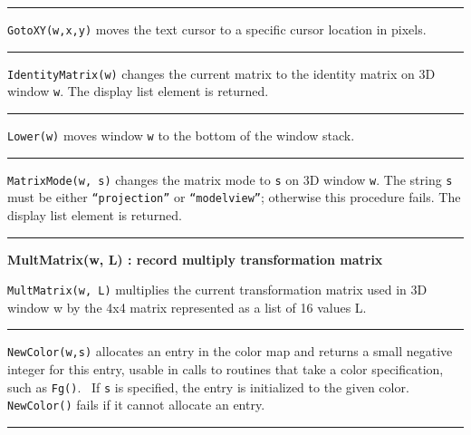 \bigskip\hrule\vspace{0.1cm}

\noindent
\texttt{GotoXY(w,x,y)} moves the text cursor to a specific cursor
location in pixels.

\bigskip\hrule\vspace{0.1cm}

\noindent
\texttt{IdentityMatrix(w)} changes the current matrix to the identity
matrix on 3D window \texttt{w}. The display list element is returned. 

\bigskip\hrule\vspace{0.1cm}

\noindent
\texttt{Lower(w)} moves window \texttt{w} to the bottom of the window
stack.

\bigskip\hrule\vspace{0.1cm}

\noindent
\texttt{MatrixMode(w, s)} changes the matrix mode to \texttt{s} on 3D
window \texttt{w}. The string \texttt{s} must be either
\texttt{{\textquotedblleft}projection{\textquotedblright}} or
\texttt{{\textquotedblleft}modelview{\textquotedblright}}; otherwise
this procedure fails. The display list element is returned.

\bigskip\hrule\vspace{0.1cm}
\noindent
{\bf MultMatrix(w, L) : record \hfill multiply transformation matrix}

\noindent
\texttt{MultMatrix(w, L)} multiplies the current transformation matrix
used in 3D window w by the 4x4 matrix represented as a list of 16
values L.

\bigskip\hrule\vspace{0.1cm}

\noindent
\texttt{NewColor(w,s)} allocates an entry in the color map and returns a
small negative integer for this entry, usable in calls to routines that
take a color specification, such as \texttt{Fg()}. \ If \texttt{s} is
specified, the entry is initialized to the given color.
\texttt{NewColor()} fails if it cannot allocate an entry.

\bigskip\hrule\vspace{0.1cm}

